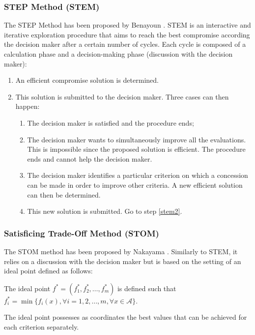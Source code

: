 \subsubsection{STEP Method (STEM)}
The STEP Method has been proposed by Benayoun \cite{benayoun71}. STEM is an interactive and iterative exploration procedure that aims to reach the best compromise according the decision maker after a certain number of cycles. Each cycle is composed of a calculation phase and a decision-making phase (discussion with the decision maker):
\begin{enumerate}
\item An efficient compromise solution is determined.
\item \label{stem2} This solution is submitted to the decision maker. Three cases can then happen:
	\begin{enumerate}
	\item The decision maker is satisfied and the procedure ends;
	\item The decision maker wants to simultaneously improve all the evaluations. This is impossible since the proposed solution is efficient. The procedure ends and cannot help the decision maker.
	\item The decision maker identifies a particular criterion on which a concession can be made in order to improve other criteria. A new efficient solution can then be determined.
	\item This new solution is submitted. Go to step \ref{stem2}.
	\end{enumerate}
\end{enumerate}

\subsubsection{Satisficing Trade-Off Method (STOM)}
The STOM method has been proposed by Nakayama \cite{nakayama84}. Similarly to STEM, it relies on a discussion with the decision maker but is based on the setting of an ideal point defined as follows:
\begin{definition}
The ideal point $f^*=(f_1^*, f_2^*, \dots, f_m^*)$ is defined such that $f_i^* = \min \{f_i(x), \forall i=1, 2, \dots, m, \forall x \in \mathcal{A}\}$.
\end{definition}
The ideal point possesses as coordinates the best values that can be achieved for each criterion separately.

